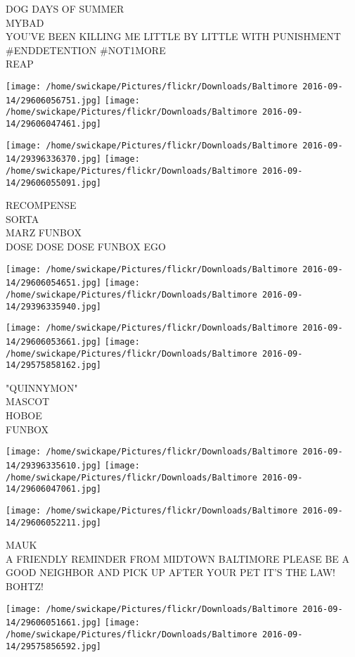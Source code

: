\documentclass[10pt,letterpaper]{article}
\begin{document}
DOG DAYS OF SUMMER\\
MYBAD\\
YOU'VE BEEN KILLING ME LITTLE BY LITTLE WITH PUNISHMENT \#ENDDETENTION \#NOT1MORE\\
REAP
\pagebreak

\texttt{[image: /home/swickape/Pictures/flickr/Downloads/Baltimore 2016-09-14/29606056751.jpg]}
\texttt{[image: /home/swickape/Pictures/flickr/Downloads/Baltimore 2016-09-14/29606047461.jpg]}

\texttt{[image: /home/swickape/Pictures/flickr/Downloads/Baltimore 2016-09-14/29396336370.jpg]}
\texttt{[image: /home/swickape/Pictures/flickr/Downloads/Baltimore 2016-09-14/29606055091.jpg]}

RECOMPENSE\\
SORTA\\
MARZ FUNBOX\\
DOSE DOSE DOSE FUNBOX EGO
\pagebreak

\texttt{[image: /home/swickape/Pictures/flickr/Downloads/Baltimore 2016-09-14/29606054651.jpg]}
\texttt{[image: /home/swickape/Pictures/flickr/Downloads/Baltimore 2016-09-14/29396335940.jpg]}

\texttt{[image: /home/swickape/Pictures/flickr/Downloads/Baltimore 2016-09-14/29606053661.jpg]}
\texttt{[image: /home/swickape/Pictures/flickr/Downloads/Baltimore 2016-09-14/29575858162.jpg]}

"QUINNYMON"\\
MASCOT\\
HOBOE\\
FUNBOX
\pagebreak

\texttt{[image: /home/swickape/Pictures/flickr/Downloads/Baltimore 2016-09-14/29396335610.jpg]}
\texttt{[image: /home/swickape/Pictures/flickr/Downloads/Baltimore 2016-09-14/29606047061.jpg]}

\vspace{0.25in}
\texttt{[image: /home/swickape/Pictures/flickr/Downloads/Baltimore 2016-09-14/29606052211.jpg]}

MAUK\\
A FRIENDLY REMINDER FROM MIDTOWN BALTIMORE PLEASE BE A GOOD NEIGHBOR AND PICK UP AFTER YOUR PET IT'S THE LAW!\\
BOHTZ!
\pagebreak

\texttt{[image: /home/swickape/Pictures/flickr/Downloads/Baltimore 2016-09-14/29606051661.jpg]}
\texttt{[image: /home/swickape/Pictures/flickr/Downloads/Baltimore 2016-09-14/29575856592.jpg]}
\end{document}
